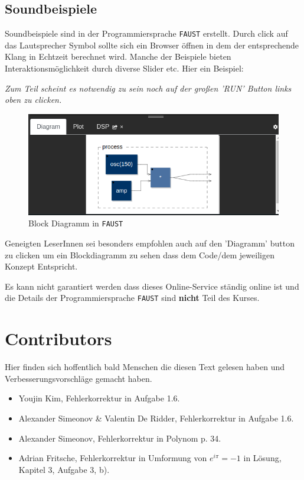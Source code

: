 \subsection*{Soundbeispiele}

Soundbeispiele sind in der Programmiersprache \texttt{FAUST} erstellt. Durch click auf das Lautsprecher Symbol sollte sich ein Browser öffnen in dem der entsprechende Klang in Echtzeit berechnet wird. Manche der Beispiele bieten Interaktionsmöglichkeit durch diverse Slider etc. Hier ein Beispiel:


\emph{Zum Teil scheint es notwendig zu sein noch auf der großen 'RUN' Button links oben zu clicken.}

\begin{figure}[h!]
	\centering
	\includegraphics[width=0.8 \textwidth]{img/faust_diag.png}
	\caption{Block Diagramm in \texttt{FAUST}}
	\label{fig:faustBlock}
\end{figure}

Geneigten LeserInnen sei besonders empfohlen auch auf den 'Diagramm' button zu clicken um ein Blockdiagramm zu sehen dass dem Code/dem jeweiligen Konzept Entspricht.

Es kann nicht garantiert werden dass dieses Online-Service ständig online ist und die Details der Programmiersprache \texttt{FAUST} sind \textbf{nicht} Teil des Kurses.

\section*{Contributors}
Hier finden sich hoffentlich bald Menschen die diesen Text gelesen haben und Verbesserungsvorschläge gemacht haben.
\begin{itemize}
	\item Youjin Kim, Fehlerkorrektur in Aufgabe 1.6.
	\item Alexander Simeonov \& Valentin De Ridder, Fehlerkorrektur in Aufgabe 1.6.
	\item Alexander Simeonov, Fehlerkorrektur in Polynom p. 34.
	\item Adrian Fritsche, Fehlerkorrektur in Umformung von $e^{i\pi}=-1$ in Lösung, Kapitel 3, Aufgabe 3, b).
\end{itemize}

